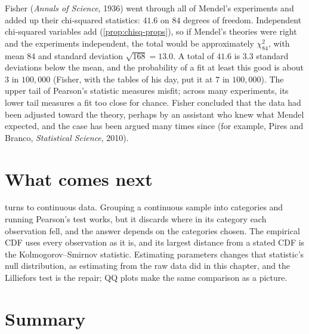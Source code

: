 \begin{sanitycheck}
Fisher (\textit{Annals of Science}, 1936) went through all of Mendel's experiments and added up their chi-squared statistics: $41.6$ on $84$ degrees of freedom.
Independent chi-squared variables add (\cref{prop:chisq-props}), so if Mendel's theories were right and the experiments independent, the total would be approximately $\chi^2_{84}$, with mean $84$ and standard deviation $\sqrt{168} = 13.0$.
A total of $41.6$ is $3.3$ standard deviations below the mean, and the probability of a fit at least this good is about $3$ in $100{,}000$ (Fisher, with the tables of his day, put it at $7$ in $100{,}000$).
The upper tail of Pearson's statistic measures misfit; across many experiments, its lower tail measures a fit too close for chance.
Fisher concluded that the data had been adjusted toward the theory, perhaps by an assistant who knew what Mendel expected, and the case has been argued many times since (for example, Pires and Branco, \textit{Statistical Science}, 2010).
\end{sanitycheck}

\section{What comes next}
\label{sec:gof-next}

 turns to continuous data.
Grouping a continuous sample into categories and running Pearson's test works, but it discards where in its category each observation fell, and the answer depends on the categories chosen.
The empirical CDF uses every observation as it is, and its largest distance from a stated CDF is the Kolmogorov--Smirnov statistic.
Estimating parameters changes that statistic's null distribution, as estimating from the raw data did in this chapter, and the Lilliefors test is the repair; QQ plots make the same comparison as a picture.

\section{Summary}
\label{sec:gof-summary}

